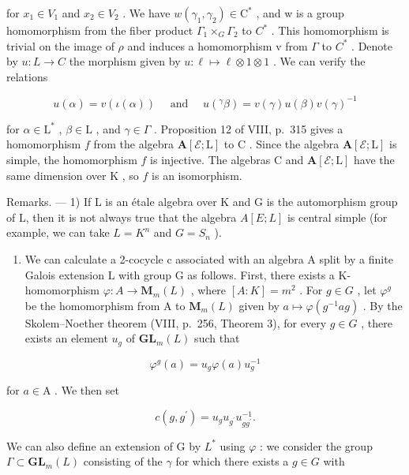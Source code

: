 for \(x_{1} \in V_{1}\) and \(x_{2} \in V_{2}\) . We have \(w(\gamma_{1}, \gamma_{2}) \in \mathrm{C}^{*}\) , and w is a group homomorphism from the fiber product \(\Gamma_{1} \times_{G} \Gamma_{2}\) to \(C^{*}\) . This homomorphism is trivial on the image of \(\rho\) and induces a homomorphism v from \(\Gamma\) to \(C^{*}\) . Denote by \(u : L \to C\) the morphism given by \(u : \ell \mapsto \ell \otimes 1 \otimes 1\) . We can verify the relations

\[
u (\alpha) = v (\iota (\alpha)) \quad \text { and } \quad u (^ {\gamma} \beta) = v (\gamma) u (\beta) v (\gamma) ^ {- 1}
\]

for \(\alpha \in \mathrm{L}^*\) , \(\beta \in \mathrm{L}\) , and \(\gamma \in \Gamma\) . Proposition 12 of VIII, p.~315 gives a homomorphism \(f\) from the algebra \(\mathbf{A}[\mathcal{E};\mathrm{L}]\) to \(\mathrm{C}\) . Since the algebra \(\mathbf{A}[\mathcal{E};\mathrm{L}]\) is simple, the homomorphism \(f\) is injective. The algebras \(\mathrm{C}\) and \(\mathbf{A}[\mathcal{E};\mathrm{L}]\) have the same dimension over \(\mathrm{K}\) , so \(f\) is an isomorphism.

Remarks. --- 1) If L is an étale algebra over K and G is the automorphism group of L, then it is not always true that the algebra \(A[E;L]\) is central simple (for example, we can take \(L = K^{n}\) and \(G = S_{n}\) ).

\begin{enumerate}
\def\labelenumi{\arabic{enumi})}
\setcounter{enumi}{1}
\tightlist
\item
  We can calculate a 2-cocycle c associated with an algebra A split by a finite Galois extension L with group G as follows. First, there exists a K-homomorphism \(\varphi: A \to \mathbf{M}_{m}(L)\) , where \([A:K] = m^{2}\) . For \(g \in G\) , let \(\varphi^{g}\) be the homomorphism from A to \(\mathbf{M}_{m}(L)\) given by \(a \mapsto \varphi(g^{-1}ag)\) . By the Skolem--Noether theorem (VIII, p.~256, Theorem 3), for every \(g \in G\) , there exists an element \(u_{g}\) of \(\mathbf{GL}_{m}(L)\) such that
\end{enumerate}

\[
\varphi^ {g} (a) = u _ {g} \varphi (a) u _ {g} ^ {- 1}
\]

for \(a\in \mathrm{A}\) . We then set

\[
c (g, g ^ {\prime}) = u _ {g} u _ {g ^ {\prime}} u _ {g g ^ {\prime}} ^ {- 1}.
\]

We can also define an extension of G by \(L^{*}\) using \(\varphi\) : we consider the group \(\Gamma \subset \mathbf{GL}_{m}(L)\) consisting of the \(\gamma\) for which there exists a \(g \in G\) with

